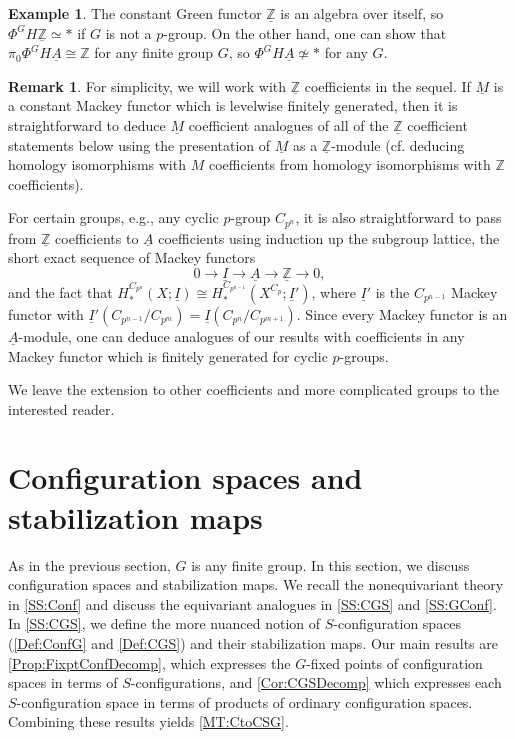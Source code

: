 \documentclass[11pt]{amsart}
\theoremstyle{definition}
\newtheorem{example}[equation]{Example}
\newtheorem{remark}[equation]{Remark}
\numberwithin{equation}{subsection} %
\def\z{\mathbb{Z}}
\def\uI{\underline{I}}
\def\uM{\underline{M}}
\def\uA{\underline{A}}
\def\uM{\underline{M}}
\def\mfz{\underline{\mathbb{Z}}}
\begin{document}
\begin{example}
The constant Green functor $\mfz$ is an algebra over itself, so $\Phi^G H\mfz \simeq *$ if $G$ is not a $p$-group. On the other hand, one can show that $\pi_0 \Phi^G H\uA \cong \z$ for any finite group $G$, so $\Phi^G H\uA \not\simeq *$ for any $G$. 
\end{example}

\begin{remark}
For simplicity, we will work with $\mfz$ coefficients in the sequel. If $\uM$ is a constant Mackey functor which is levelwise finitely generated, then it is straightforward to deduce $\uM$ coefficient analogues of all of the $\mfz$ coefficient statements below using the presentation of $\uM$ as a $\mfz$-module (cf. deducing homology isomorphisms with $M$ coefficients from homology isomorphisms with $\z$ coefficients). 

For certain groups, e.g., any cyclic $p$-group $C_{p^n}$, it is also straightforward to pass from $\mfz$ coefficients to $\uA$ coefficients using induction up the subgroup lattice, the short exact sequence of Mackey functors
$$0 \to \uI \to \uA \to \mfz \to 0,$$
and the fact that $H_*^{C_{p^n}}(X;\uI) \cong H_*^{C_{p^{n-1}}}(X^{C_p};\uI')$, where $\uI'$ is the $C_{p^{n-1}}$ Mackey functor with $\uI'(C_{p^{n-1}}/C_{p^m}) = \uI(C_{p^n}/C_{p^{m+1}})$. Since every Mackey functor is an $\uA$-module, one can deduce analogues of our results with coefficients in any Mackey functor which is finitely generated for cyclic $p$-groups. 

We leave the extension to other coefficients and more complicated groups to the interested reader. 
\end{remark}


\section{Configuration spaces and stabilization maps}\label{Sec:Conf}

As in the previous section, $G$ is any finite group. In this section, we discuss configuration spaces and stabilization maps. We recall the nonequivariant theory in \cref{SS:Conf} and discuss the equivariant analogues in \cref{SS:CGS} and \cref{SS:GConf}. In \cref{SS:CGS}, we define the more nuanced notion of $S$-configuration spaces (\cref{Def:ConfG} and \cref{Def:CGS}) and their stabilization maps. Our main results are \cref{Prop:FixptConfDecomp}, which expresses the $G$-fixed points of configuration spaces in terms of $S$-configurations, and \cref{Cor:CGSDecomp} which expresses each $S$-configuration space in terms of products of ordinary configuration spaces. Combining these results yields \cref{MT:CtoCSG}.
\end{document}
